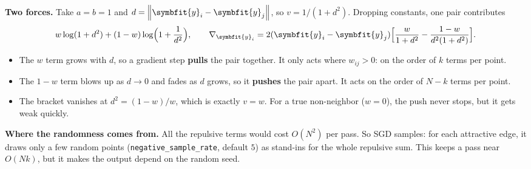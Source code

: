 \documentclass[11pt]{article}
\newcommand{\bm}[1]{\symbfit{#1}}
\newcommand{\norm}[1]{\left\lVert #1\right\rVert}
\begin{document}
\begin{intuition}
\textbf{Two forces.} Take $a=b=1$ and $d=\norm{\bm y_i-\bm y_j}$, so $v=1/(1+d^2)$. Dropping constants, one pair contributes
\[
w\log(1+d^2)+(1-w)\log\!\Big(1+\frac1{d^2}\Big),\qquad
\nabla_{\bm y_i}=2(\bm y_i-\bm y_j)\Big[\frac{w}{1+d^2}-\frac{1-w}{d^2(1+d^2)}\Big].
\]
\begin{itemize}[nosep,leftmargin=*]
\item The $w$ term grows with $d$, so a gradient step \textbf{pulls} the pair together. It only acts where $w_{ij}>0$: on the order of $k$ terms per point.
\item The $1-w$ term blows up as $d\to0$ and fades as $d$ grows, so it \textbf{pushes} the pair apart. It acts on the order of $N-k$ terms per point.
\item The bracket vanishes at $d^2=(1-w)/w$, which is exactly $v=w$. For a true non-neighbor ($w=0$), the push never stops, but it gets weak quickly.
\end{itemize}
\textbf{Where the randomness comes from.} All the repulsive terms would cost $O(N^2)$ per pass. So SGD samples: for each attractive edge, it draws only a few random points (\texttt{negative\_sample\_rate}, default $5$)
as stand-ins for the whole repulsive sum. This keeps a pass near $O(Nk)$, but it makes the output depend on the random seed.
\end{intuition}
\end{document}
